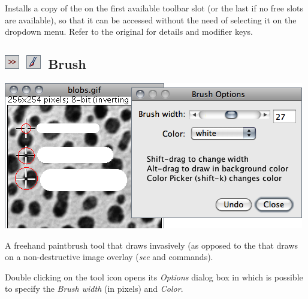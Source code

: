 Installs a copy of the  on the first available
toolbar slot (or the last if no free slots are available), so that
it can be accessed without the need of selecting it on the 
dropdown menu. Refer to the original  for
details and modifier keys.




\subsection[Brush]{\noindent \textsf{\protect\includegraphics[bb=0bp 5bp 20bp 20bp,scale=0.6]{images/tools/Switcher}}~\textsf{\protect\includegraphics[bb=0bp 5bp 20bp 20bp,scale=0.6]{images/tools/Brush1}}~Brush\label{sub:Brush}}

\begin{minipage}[c][1\totalheight][t]{0.667\columnwidth}%
\includegraphics[scale=0.55]{images/Brush}%
\end{minipage}%
\begin{minipage}[c][1\totalheight][t]{0.333\columnwidth}%
A freehand paintbrush
tool that draws invasively (as opposed to the 
that draws on a non-destructive image overlay (\emph{see} 
and  commands).\medskip{}


Double clicking on the tool icon opens its \emph{Options} dialog box
in which is possible to specify the \emph{Brush width} (in pixels)
and \emph{Color}.%
\end{minipage}

